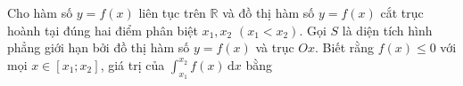 \begin{ex}
Cho hàm số $y=f(x)$ liên tục trên $\mathbb R$ và đồ thị hàm số $y=f(x)$ cắt trục hoành tại đúng hai điểm phân biệt $x_1,x_2$ $(x_1<x_2)$. Gọi $S$ là diện tích hình phẳng giới hạn bởi đồ thị hàm số $y=f(x)$ và trục $Ox$. Biết rằng $f(x)\le0$ với mọi $x\in[x_1;x_2]$, giá trị của $\displaystyle\int_{x_1}^{x_2}f(x)\,\mathrm dx$ bằng
\end{ex}
